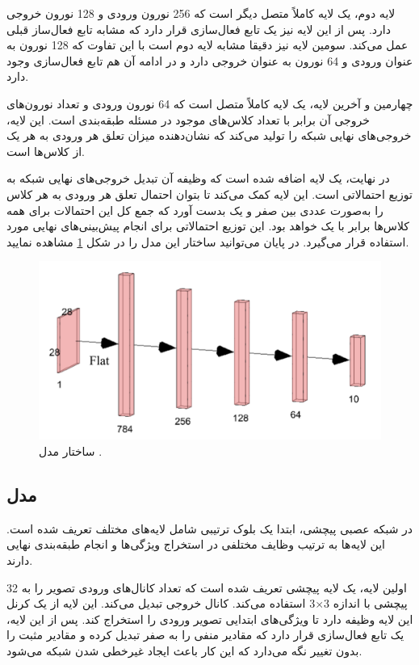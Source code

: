 لایه دوم، یک لایه کاملاً متصل دیگر است که 256 نورون ورودی و 128 نورون خروجی دارد. پس از این لایه نیز یک تابع فعال‌سازی
قرار دارد که مشابه تابع فعال‌ساز قبلی عمل می‌کند. سومین لایه نیز دقیقا مشابه لایه دوم است با این تفاوت که 128 نورون به عنوان ورودی و 64 نورون به عنوان خروجی دارد و در ادامه آن هم تابع فعال‌سازی
وجود دارد.

چهارمین و آخرین لایه، یک لایه کاملاً متصل است که 64 نورون ورودی و تعداد نورون‌های خروجی آن برابر با تعداد کلاس‌های موجود در مسئله طبقه‌بندی است. این لایه، خروجی‌های نهایی شبکه را تولید می‌کند که نشان‌دهنده میزان تعلق هر ورودی به هر یک از کلاس‌ها است.

در نهایت، یک لایه 
اضافه شده است که وظیفه آن تبدیل خروجی‌های نهایی شبکه به توزیع احتمالاتی است. این لایه کمک می‌کند تا بتوان احتمال تعلق هر ورودی به هر کلاس را به‌صورت عددی بین صفر و یک بدست آورد که جمع کل این احتمالات برای همه کلاس‌ها برابر با یک خواهد بود. این توزیع احتمالاتی برای انجام پیش‌بینی‌های نهایی مورد استفاده قرار می‌گیرد. در پایان می‌توانید ساختار این مدل را در شکل
\ref{mlp}
مشاهده نمایید.

\begin{figure}[t!]
	\centering
	\includegraphics[scale=0.7]{images/chap5/mlp.png}%
	\caption{
		ساختار مدل 
		.
	}
	\label{mlp}
	\centering
\end{figure}



\subsection{
	مدل
}
در شبکه عصبی پیچشی، ابتدا یک بلوک ترتیبی شامل لایه‌های مختلف تعریف شده است. این لایه‌ها به ترتیب وظایف مختلفی در استخراج ویژگی‌ها و انجام طبقه‌بندی نهایی دارند.

اولین لایه، یک لایه پیچشی تعریف شده است که تعداد کانال‌های ورودی تصویر را به 32 کانال خروجی تبدیل می‌کند. این لایه از یک کرنل ‎پیچشی با اندازه
3$\times$3
استفاده می‌کند. این لایه وظیفه دارد تا ویژگی‌های ابتدایی تصویر ورودی را استخراج کند. پس از این لایه، یک تابع فعال‌سازی 
قرار دارد که مقادیر منفی را به صفر تبدیل کرده و مقادیر مثبت را بدون تغییر نگه می‌دارد که این کار باعث ایجاد غیرخطی‌ شدن شبکه می‌شود.

